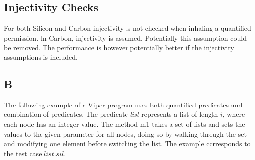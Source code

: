 \documentclass[12pt]{article}
\begin{document}
\subsection{Injectivity Checks}
For both Silicon and Carbon injectivity is not checked when inhaling a quantified permission. In Carbon, injectivity is assumed. Potentially this assumption could be removed. The performance is however potentially better if the injectivity assumptions is included.

\subsection{B}
The following example of a Viper program uses both quantified predicates and combination of predicates. The predicate \textit{list} represents a list of length \(i\), where each node has an integer value. The method m1 takes a set of lists and sets the values to the given parameter for all nodes, doing so by walking through the set and modifying one element before switching the list. The example corresponds to the test case \(list.sil\).
\end{document}
